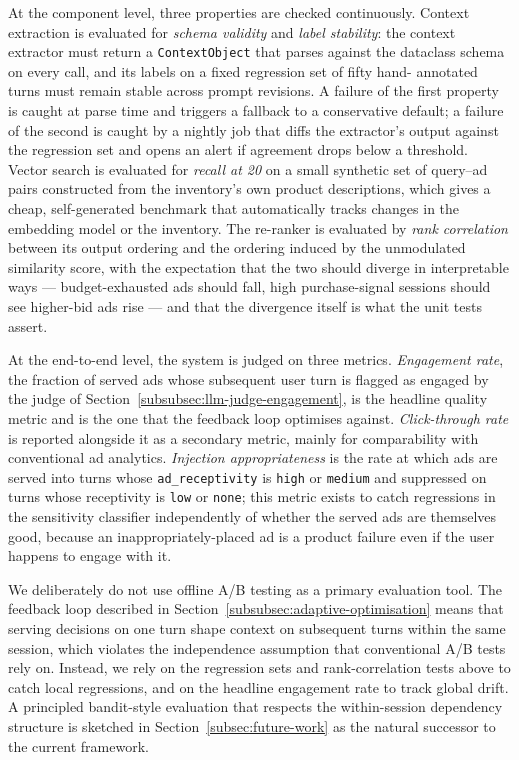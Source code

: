 At the component level, three properties are checked continuously.
Context extraction is evaluated for \emph{schema validity} and
\emph{label stability}: the context extractor must return a
\texttt{ContextObject} that parses against the dataclass schema on
every call, and its labels on a fixed regression set of fifty hand-
annotated turns must remain stable across prompt revisions. A failure
of the first property is caught at parse time and triggers a fallback
to a conservative default; a failure of the second is caught by a
nightly job that diffs the extractor's output against the regression
set and opens an alert if agreement drops below a threshold. Vector
search is evaluated for \emph{recall at 20} on a small synthetic set
of query--ad pairs constructed from the inventory's own product
descriptions, which gives a cheap, self-generated benchmark that
automatically tracks changes in the embedding model or the inventory.
The re-ranker is evaluated by \emph{rank correlation} between its
output ordering and the ordering induced by the unmodulated similarity
score, with the expectation that the two should diverge in
interpretable ways --- budget-exhausted ads should fall, high
purchase-signal sessions should see higher-bid ads rise --- and that
the divergence itself is what the unit tests assert.

At the end-to-end level, the system is judged on three metrics.
\emph{Engagement rate}, the fraction of served ads whose subsequent
user turn is flagged as engaged by the judge of
Section~\ref{subsubsec:llm-judge-engagement}, is the headline quality
metric and is the one that the feedback loop optimises against.
\emph{Click-through rate} is reported alongside it as a secondary
metric, mainly for comparability with conventional ad analytics.
\emph{Injection appropriateness} is the rate at which ads are served
into turns whose \texttt{ad\_receptivity} is \texttt{high} or
\texttt{medium} and suppressed on turns whose receptivity is
\texttt{low} or \texttt{none}; this metric exists to catch regressions
in the sensitivity classifier independently of whether the served ads
are themselves good, because an inappropriately-placed ad is a product
failure even if the user happens to engage with it.

We deliberately do not use offline A/B testing as a primary evaluation
tool. The feedback loop described in
Section~\ref{subsubsec:adaptive-optimisation} means that serving
decisions on one turn shape context on subsequent turns within the
same session, which violates the independence assumption that
conventional A/B tests rely on. Instead, we rely on the regression
sets and rank-correlation tests above to catch local regressions, and
on the headline engagement rate to track global drift. A principled
bandit-style evaluation that respects the within-session dependency
structure is sketched in Section~\ref{subsec:future-work} as the
natural successor to the current framework.

